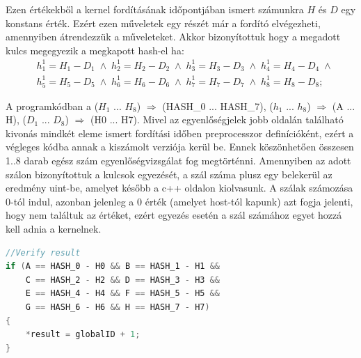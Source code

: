 %
Ezen értékekből a kernel fordításának időpontjában ismert számunkra $H$ és $D$ egy konstans érték. Ezért ezen műveletek egy részét már a fordító elvégezheti, amennyiben átrendezzük a műveleteket. Akkor bizonyítottuk hogy a megadott kulcs megegyezik a megkapott hash-el ha:
%
\begin{equation*}
    \begin{aligned}
    &h_1^1 = H_1 - D_1 \;\land\; h_2^1 = H_2 - D_2 \;\land\; h_3^1 = H_3 - D_3 \;\land\; h_4^1 = H_4 - D_4 \;\land \\
    &h_5^1 = H_5 - D_5 \;\land\; h_6^1 = H_6 - D_6 \;\land\; h_7^1 = H_7 - D_7 \;\land\; h_8^1 = H_8 - D_8;
    \end{aligned}
\end{equation*}

A programkódban a ($H_1$ ... $H_8$) $\Rightarrow$ (HASH\_0 ... HASH\_7), ($h_1$ ... $h_8$) $\Rightarrow$ (A ... H), ($D_1$ ... $D_8$) $\Rightarrow$ (H0 ... H7). Mivel az egyenlőségjelek jobb oldalán található kivonás mindkét eleme ismert fordítási időben preprocesszor definícióként, ezért a végleges kódba annak a kiszámolt verziója kerül be. Ennek köszönhetően összesen 1..8 darab egész szám egyenlőségvizsgálat fog megtörténni. Amennyiben az adott szálon bizonyítottuk a kulcsok egyezését, a szál száma plusz egy belekerül az eredmény uint-be, amelyet később a c++ oldalon kiolvasunk. A szálak számozása 0-tól indul, azonban jelenleg a 0 érték (amelyet host-tól kapunk) azt fogja jelenti, hogy nem találtuk az értéket, ezért egyezés esetén a szál számához egyet hozzá kell adnia a kernelnek.

\begin{lstlisting}[language={C++}]
//Verify result
if (A == HASH_0 - H0 && B == HASH_1 - H1 &&
    C == HASH_2 - H2 && D == HASH_3 - H3 &&
    E == HASH_4 - H4 && F == HASH_5 - H5 &&
    G == HASH_6 - H6 && H == HASH_7 - H7)
{
    *result = globalID + 1;
}
\end{lstlisting}

